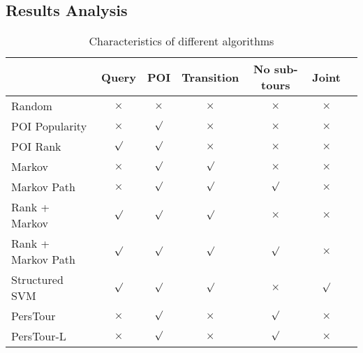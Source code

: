 
\subsection{Results Analysis}
\begin{table*}
\centering
\begin{tabular}{l|cccccc} \hline
 & Query & POI & Transition & No sub-tours & Joint \\ \hline
Random         & $\times$ & $\times$ & $\times$ & $\times$ & $\times$ \\ 
POI Popularity & $\times$ & $\surd$ & $\times$ & $\times$ & $\times$ \\ 
POI Rank       & $\surd$  & $\surd$ & $\times$ & $\times$ & $\times$ \\
Markov         & $\times$ & $\surd$ & $\surd$ & $\times$ & $\times$ \\
Markov Path    & $\times$ & $\surd$ & $\surd$ & $\surd$ & $\times$ \\
Rank + Markov  & $\surd$ & $\surd$ & $\surd$ & $\times$ & $\times$ \\
Rank + Markov Path & $\surd$ & $\surd$ & $\surd$ & $\surd$ & $\times$ \\
Structured SVM & $\surd$ & $\surd$ & $\surd$ & $\times$ & $\surd$ \\
PersTour\cite{ijcai15} & $\times$ & $\surd$ & $\times$ & $\surd$ & $\times$ \\
PersTour-L & $\times$ & $\surd$ & $\times$ & $\surd$ & $\times$ \\ \hline
\end{tabular}
\caption{Characteristics of different algorithms}
\label{table:character}
\end{table*}
